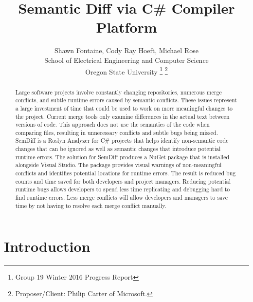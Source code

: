 \documentclass[draftclsnofoot,onecolumn]{IEEEtran}
\begin{document}
\lstset{style=cSharp}
\title{Semantic Diff via C\# Compiler Platform}

\author{Shawn Fontaine, Cody Ray Hoeft, Michael Rose\\
	School of Electrical Engineering and Computer Science\\
	Oregon State University
\thanks{Group 19 Winter 2016 Progress Report}
\thanks{Proposer/Client: Philip Carter of Microsoft.}}

\maketitle
{} %

\begin{abstract}
Large software projects involve constantly changing repositories, numerous 
merge conflicts, and subtle runtime errors caused by semantic conflicts. These 
issues represent a large investment of time that could be used to work on more 
meaningful changes to the project. Current merge tools only examine differences 
in the actual text between versions of code. This approach does not use the 
semantics of the code when comparing files, resulting in unnecessary conflicts 
and subtle bugs being missed. SemDiff is a Roslyn Analyzer for C\# projects 
that helps identify non-semantic code changes that can be ignored as well as 
semantic changes that introduce potential runtime errors. The solution for 
SemDiff produces a NuGet package that is installed alongside Visual Studio. The 
package provides visual warnings of non-meaningful conflicts and identifies 
potential locations for runtime errors. The result is reduced bug counts and 
time saved for both developers and project managers. Reducing potential runtime 
bugs allows developers to spend less time replicating and debugging hard to 
find runtime errors. Less merge conflicts will allow developers and managers to 
save time by not having to resolve each merge conflict manually.

\end{abstract}

\newpage
\setcounter{tocdepth}{2}
\tableofcontents


\newpage
{}

\section{Introduction}%
\end{document}
